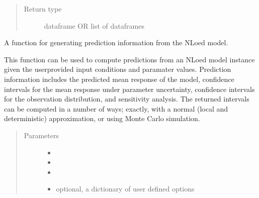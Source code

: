 \documentclass[letterpaper,10pt,english,openany,oneside]{sphinxmanual}
\begin{document}
\begin{fulllineitems}
\begin{fulllineitems}
\begin{quote}
\begin{description}
\begin{description}
\end{description}


\item[{Return type}] \leavevmode
dataframe OR list of dataframes

\end{description}\end{quote}

\end{fulllineitems}


\begin{fulllineitems}
\label{\detokenize{nloed:nloed.model.Model.predict}}
A function for generating prediction information from the NLoed model.

This function can be used to compute predictions from an NLoed model instance given the
user\sphinxhyphen{}provided input conditions and paramater values. Prediction information includes the
predicted mean response of the model, confidence intervals for the mean response under
parameter uncertainty, confidence intervals for the observation distribution, and sensitivity
analysis. The returned intervals can be computed in a number of ways; exactly, with a normal
(local and deterministic) approximation, or using Monte Carlo simulation.
\begin{quote}\begin{description}
\item[{Parameters}] \leavevmode\begin{itemize}
\item {} 
 \textendash{} 

\item {} 
 \textendash{} 

\item {} 
 \textendash{} 

\item {} 
 \textendash{} optional,  a dictionary of user defined options


\end{itemize}
\end{description}
\end{quote}
\end{fulllineitems}
\end{fulllineitems}
\end{document}
